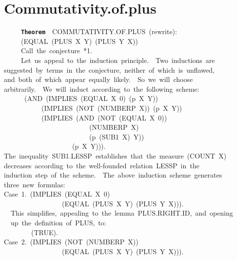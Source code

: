 \documentclass[11pt]{book}
\newenvironment{pubasis}{\begin{flushleft}\ttfamily\small}{\normalsize\rmfamily\end{flushleft}}
\newcommand{\axiomordefinition}[1]{\vspace{6pt}\texttt{\textbf{#1}}}
\newcommand{\pubdefaulttextsize}{\large}
\begin{document}
\section{Commutativity.of.plus}
\pubdefaulttextsize
\begin{pubasis}
~~~~~\axiomordefinition{Theorem}~~COM\-MU\-TA\-TIV\-ITY.OF.PLUS~(rewrite):\\
~~~~~(EQUAL~(PLUS~X~Y)~(PLUS~Y~X))\\

~~~~~Call~the~conjecture~*1.\\

~~~~~Let~us~appeal~to~the~induction~principle.~~Two~inductions~are\\
suggested~by~terms~in~the~conjecture,~neither~of~which~is~unflawed,\\
and~both~of~which~appear~equally~likely.~~So~we~will~choose\\
arbitrarily.~~We~will~induct~according~to~the~following~scheme:\\
~~~~~~(AND~(IMPLIES~(EQUAL~X~0)~(p~X~Y))\\
~~~~~~~~~~~(IMPLIES~(NOT~(NUMBERP~X))~(p~X~Y))\\
~~~~~~~~~~~(IMPLIES~(AND~(NOT~(EQUAL~X~0))\\
~~~~~~~~~~~~~~~~~~~~~~~~~(NUMBERP~X)\\
~~~~~~~~~~~~~~~~~~~~~~~~~(p~(SUB1~X)~Y))\\
~~~~~~~~~~~~~~~~~~~~(p~X~Y))).\\
The~inequality~SUB1.LESSP~establishes~that~the~measure~(COUNT~X)\\
decreases~according~to~the~well-founded~relation~LESSP~in~the\\
induction~step~of~the~scheme.~~The~above~induction~scheme~generates\\
three~new~formulas:\\

Case~1.~(IMPLIES~(EQUAL~X~0)\\
~~~~~~~~~~~~~~~~~(EQUAL~(PLUS~X~Y)~(PLUS~Y~X))).\\

~~This~simplifies,~appealing~to~the~lemma~PLUS.RIGHT.ID,~and~opening\\
~~up~the~definition~of~PLUS,~to:\\

~~~~~~~~(TRUE).\\

Case~2.~(IMPLIES~(NOT~(NUMBERP~X))\\
~~~~~~~~~~~~~~~~~(EQUAL~(PLUS~X~Y)~(PLUS~Y~X))).\\


\end{pubasis}
\end{document}
